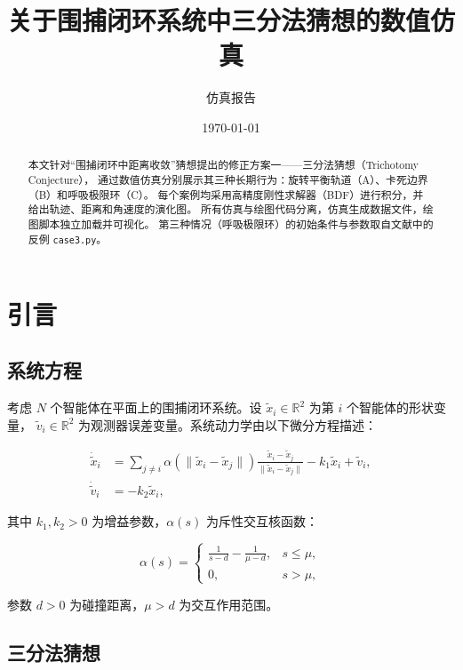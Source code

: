 \documentclass[11pt,a4paper]{article}
\title{关于围捕闭环系统中三分法猜想的数值仿真}
\author{仿真报告}
\date{\today}
\begin{document}
\maketitle

\begin{abstract}
本文针对“围捕闭环中距离收敛”猜想提出的修正方案一——三分法猜想（Trichotomy Conjecture），
通过数值仿真分别展示其三种长期行为：旋转平衡轨道（A）、卡死边界（B）和呼吸极限环（C）。
每个案例均采用高精度刚性求解器（BDF）进行积分，并给出轨迹、距离和角速度的演化图。
所有仿真与绘图代码分离，仿真生成数据文件，绘图脚本独立加载并可视化。
第三种情况（呼吸极限环）的初始条件与参数取自文献中的反例 \texttt{case3.py}。
\end{abstract}

\section{引言}

\subsection{系统方程}

考虑 $N$ 个智能体在平面上的围捕闭环系统。设 $\tilde{x}_i \in \mathbb{R}^2$ 为第 $i$ 个智能体的形状变量，
$\tilde{v}_i \in \mathbb{R}^2$ 为观测器误差变量。系统动力学由以下微分方程描述：

\begin{align}
\dot{\tilde{x}}_i &= \sum_{j \neq i} \alpha(\|\tilde{x}_i - \tilde{x}_j\|)
\frac{\tilde{x}_i - \tilde{x}_j}{\|\tilde{x}_i - \tilde{x}_j\|}
- k_1 \tilde{x}_i + \tilde{v}_i, \label{eq:xi} \\
\dot{\tilde{v}}_i &= -k_2 \tilde{x}_i, \label{eq:vt}
\end{align}

其中 $k_1, k_2 > 0$ 为增益参数，$\alpha(s)$ 为斥性交互核函数：

\begin{equation}
\alpha(s) =
\begin{cases}
\displaystyle\frac{1}{s-d} - \frac{1}{\mu-d}, & s \le \mu, \\
0, & s > \mu,
\end{cases}
\label{eq:alpha}
\end{equation}

参数 $d > 0$ 为碰撞距离，$\mu > d$ 为交互作用范围。

\subsection{三分法猜想}
\end{document}

